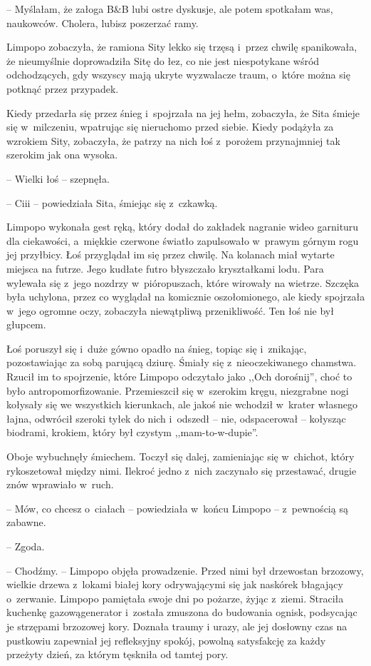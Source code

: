 \documentclass[oneside,polish,11pt,sfheadings]{mwbk}
\begin{document}
-- Myślałam, że załoga B\&B lubi ostre dyskusje, ale potem
spotkałam was, naukowców. Cholera, lubisz poszerzać ramy.

Limpopo zobaczyła, że ramiona Sity lekko się trzęsą i~przez chwilę
spanikowała, że nieumyślnie doprowadziła Sitę do łez, co nie jest
niespotykane wśród odchodzących, gdy wszyscy mają ukryte wyzwalacze
traum, o~które można się potknąć przez przypadek.

Kiedy przedarła się przez śnieg i~spojrzała na jej hełm, zobaczyła, że
Sita śmieje się w~milczeniu, wpatrując się nieruchomo przed siebie.
Kiedy podążyła za wzrokiem Sity, zobaczyła, że patrzy na nich łoś z~porożem przynajmniej tak szerokim jak ona wysoka.

-- Wielki łoś -- szepnęła.

-- Ciii -- powiedziała Sita, śmiejąc się z~czkawką.

Limpopo wykonała gest ręką, który dodał do zakładek nagranie wideo
garnituru dla ciekawości, a~miękkie czerwone światło zapulsowało w~prawym górnym rogu jej przyłbicy. Łoś przyglądał im się przez chwilę. Na
kolanach miał wytarte miejsca na futrze. Jego kudłate futro błyszczało
kryształkami lodu. Para wylewała się z~jego nozdrzy w~pióropuszach,
które wirowały na wietrze. Szczęka była uchylona, przez co wyglądał na
komicznie oszołomionego, ale kiedy spojrzała w~jego ogromne oczy,
zobaczyła niewątpliwą przenikliwość. Ten łoś nie był głupcem.

Łoś poruszył się i~duże gówno opadło na śnieg, topiąc się i~znikając,
pozostawiając za sobą parującą dziurę. Śmiały się z~nieoczekiwanego
chamstwa. Rzucił im to spojrzenie, które Limpopo odczytało jako ,,Och
dorośnij'', choć to było antropomorfizowanie. Przemieszcił się w~szerokim kręgu, niezgrabne nogi kołysały się we wszystkich kierunkach,
ale jakoś nie wchodził w~krater własnego łajna, odwrócił szeroki tyłek
do nich i~odszedł -- nie, odspacerował -- kołysząc biodrami, krokiem,
który był czystym ,,mam-to-w-dupie''.

Oboje wybuchnęły śmiechem. Toczył się dalej, zamieniając się w~chichot,
który rykoszetował między nimi. Ilekroć jedno z~nich zaczynało się
przestawać, drugie znów wprawiało w~ruch.

-- Mów, co chcesz o~ciałach -- powiedziała w~końcu Limpopo -- z~pewnością
są zabawne.

-- Zgoda.

-- Chodźmy. -- Limpopo objęła prowadzenie. Przed nimi był drzewostan
brzozowy, wielkie drzewa z~lokami białej kory odrywającymi się jak
naskórek błagający o~zerwanie. Limpopo pamiętała swoje dni po pożarze,
żyjąc z~ziemi. Straciła kuchenkę gazową\dywiz generator i~została zmuszona do
budowania ognisk, podsycając je strzępami brzozowej kory. Doznała traumy
i urazy, ale jej dosłowny czas na pustkowiu zapewniał jej refleksyjny
spokój, powolną satysfakcję za każdy przeżyty dzień, za którym tęskniła
od tamtej pory.
\end{document}
